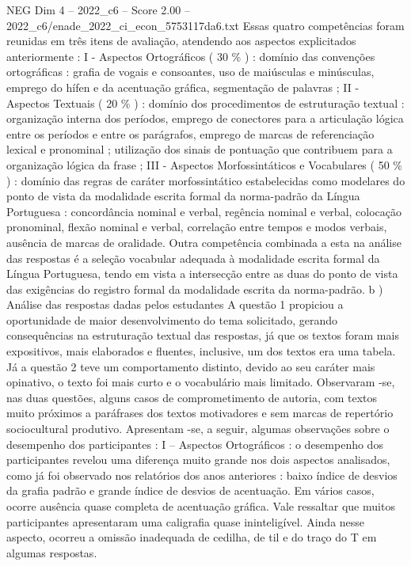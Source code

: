 \begin{textsample}{NEG Dim 4 – 2022\_c6 – Score 2.00 – 2022\_c6/enade\_2022\_ci\_econ\_5753117da6.txt}
Essas quatro competências foram reunidas em três itens de avaliação, atendendo aos aspectos explicitados anteriormente : I - Aspectos Ortográficos ( 30 \% ) : domínio das convenções ortográficas : grafia de vogais e consoantes, uso de maiúsculas e minúsculas, emprego do hífen e da acentuação gráfica, segmentação de palavras ; II - Aspectos Textuais ( 20 \% ) : domínio dos procedimentos de estruturação textual : organização interna dos períodos, emprego de conectores para a articulação lógica entre os períodos e entre os parágrafos, emprego de marcas de referenciação lexical e pronominal ; utilização dos sinais de pontuação que contribuem para a organização lógica da frase ; III - Aspectos Morfossintáticos e Vocabulares ( 50 \% ) : domínio das regras de caráter morfossintático estabelecidas como modelares do ponto de vista da modalidade escrita formal da norma-padrão da Língua Portuguesa : concordância nominal e verbal, regência nominal e verbal, colocação pronominal, flexão nominal e verbal, correlação entre tempos e modos verbais, ausência de marcas de oralidade.
Outra competência combinada a esta na análise das respostas é a seleção vocabular adequada à modalidade escrita formal da Língua Portuguesa, tendo em vista a intersecção entre as duas do ponto de vista das exigências do registro formal da modalidade escrita da norma-padrão. b ) Análise das respostas dadas pelos estudantes A questão 1 propiciou a oportunidade de maior desenvolvimento do tema solicitado, gerando consequências na estruturação textual das respostas, já que os textos foram mais expositivos, mais elaborados e fluentes, inclusive, um dos textos era uma tabela.
Já a questão 2 teve um comportamento distinto, devido ao seu caráter mais opinativo, o texto foi mais curto e o vocabulário mais limitado.
Observaram -se, nas duas questões, alguns casos de comprometimento de autoria, com textos muito próximos a paráfrases dos textos motivadores e sem marcas de repertório sociocultural produtivo.
Apresentam -se, a seguir, algumas observações sobre o desempenho dos participantes : I – Aspectos Ortográficos : o desempenho dos participantes revelou uma diferença muito grande nos dois aspectos analisados, como já foi observado nos relatórios dos anos anteriores : baixo índice de desvios da grafia padrão e grande índice de desvios de acentuação.
Em vários casos, ocorre ausência quase completa de acentuação gráfica.
Vale ressaltar que muitos participantes apresentaram uma caligrafia quase ininteligível.
Ainda nesse aspecto, ocorreu a omissão inadequada de cedilha, de til e do traço do T em algumas respostas.

\end{textsample}
